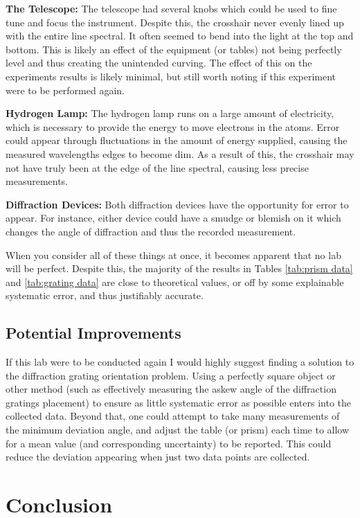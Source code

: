 \documentclass[letterpaper,11pt] {article}
\begin{document}
\textbf{The Telescope:}
The telescope had several knobs which could be used to fine tune and focus the instrument. Despite this, the crosshair never evenly lined up with the entire line spectral. It often seemed to bend into the light at the top and bottom. This is likely an effect of the equipment (or tables) not being perfectly level and thus creating the unintended curving. The effect of this on the experiments results is likely minimal, but still worth noting if this experiment were to be performed again.

\textbf{Hydrogen Lamp:}
The hydrogen lamp runs on a large amount of electricity, which is necessary to provide the energy to move electrons in the atoms. Error could appear through fluctuations in the amount of energy supplied, causing the measured wavelengths edges to become dim. As a result of this, the crosshair may not have truly been at the edge of the line spectral, causing less precise measurements.

\textbf{Diffraction Devices:}
Both diffraction devices have the opportunity for error to appear. For instance, either device could have a smudge or blemish on it which changes the angle of diffraction and thus the recorded measurement.

When you consider all of these things at once, it becomes apparent that no lab will be perfect. Despite this, the majority of the results in Tables \ref{tab:prism data} and \ref{tab:grating data} are close to theoretical values, or off by some explainable systematic error, and thus justifiably accurate. 

\subsection{Potential Improvements}
If this lab were to be conducted again I would highly suggest finding a solution to the diffraction grating orientation problem. Using a perfectly square object or other method (such as effectively measuring the askew angle of the diffraction gratings placement) to ensure as little systematic error as possible enters into the collected data. Beyond that, one could attempt to take many measurements of the minimum deviation angle, and adjust the table (or prism) each time to allow for a mean value (and corresponding uncertainty) to be reported. This could reduce the deviation appearing when just two data points are collected.

\section{Conclusion}
\end{document}
